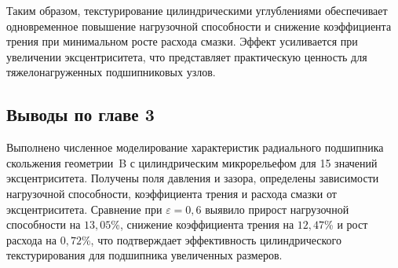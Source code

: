Таким образом, текстурирование цилиндрическими углублениями обеспечивает одновременное повышение нагрузочной способности и снижение коэффициента трения при минимальном росте расхода смазки. Эффект усиливается при увеличении эксцентриситета, что представляет практическую ценность для тяжелонагруженных подшипниковых узлов.

\subsection*{Выводы по главе 3}
{}

Выполнено численное моделирование характеристик радиального подшипника скольжения геометрии~B с цилиндрическим микрорельефом для 15 значений эксцентриситета. Получены поля давления и зазора, определены зависимости нагрузочной способности, коэффициента трения и расхода смазки от эксцентриситета. Сравнение при $\varepsilon = 0{,}6$ выявило прирост нагрузочной способности на $13{,}05$\%, снижение коэффициента трения на $12{,}47$\% и рост расхода на $0{,}72$\%, что подтверждает эффективность цилиндрического текстурирования для подшипника увеличенных размеров.
